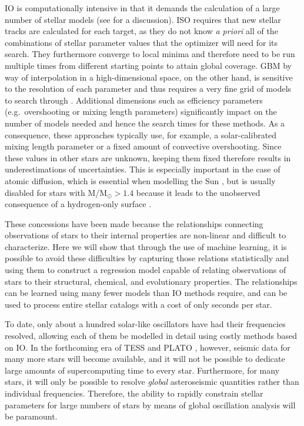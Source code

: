 \documentclass[twocolumn,twocolappendix]{aastex6}
\newif\ifref
\newcommand{\mb}[1]{\ifref\boldmath\textbf{#1}\unboldmath\else #1\fi}
\begin{document}
IO is computationally intensive in that it demands the calculation of a large number of stellar models (see \citealt{2009ApJ...699..373M} for a discussion). ISO requires that new stellar tracks are calculated for each target, as they do not know \emph{a priori} all of the combinations of stellar parameter values that the optimizer will need for its search. They furthermore converge to local minima and therefore need to be run multiple times from different starting points to attain global coverage. GBM by way of interpolation in a high-dimensional space, on the other hand, is sensitive to the resolution of each parameter and thus requires a very fine grid of models to search through \citep[see e.g.][who use more than five million models that were varied in just four initial parameters]{2010ApJ...725.2176Q}. Additional dimensions such as efficiency parameters (e.g.\ overshooting or mixing length parameters) significantly impact on the number of models needed and hence the search times for these methods. As a consequence, these approaches typically use, for example, a solar-calibrated mixing length parameter or a fixed amount of convective overshooting. Since these values in other stars are unknown, keeping them fixed therefore results in underestimations of uncertainties. This is especially important in the case of atomic diffusion, which is essential when modelling the Sun \citep[see e.g.][]{1994MNRAS.269.1137B}, but is usually disabled for stars with M/M$_\odot > 1.4$ because it leads to the unobserved consequence of a hydrogen-only surface \citep{2002A&A...390..611M}. 

These concessions have been made because the relationships connecting \mb{observations} of stars to their internal \mb{properties} are non-linear and difficult to characterize. Here we will show that through the use of machine learning, it is possible to avoid these difficulties by capturing those relations statistically and using them to construct a regression model capable of relating observations of stars to their structural, chemical, and evolutionary properties. The relationships can be learned using many fewer models than IO methods require, and can be used to process entire stellar catalogs with a cost of only seconds per star. 

To date, only about a hundred solar-like oscillators have had their frequencies resolved, allowing each of them be modelled in detail using costly methods based on IO. In the forthcoming era of TESS \citep{2015JATIS...1a4003R} and PLATO \citep{2014ExA....38..249R}, however, seismic data for many more stars will become available, and it will not be possible to dedicate large amounts of supercomputing time to every star. Furthermore, for many stars, it will only be possible to resolve \emph{global} asteroseismic quantities rather than individual frequencies. Therefore, the ability to rapidly constrain stellar parameters for large numbers of stars by means of global oscillation analysis will be paramount. 
\end{document}
